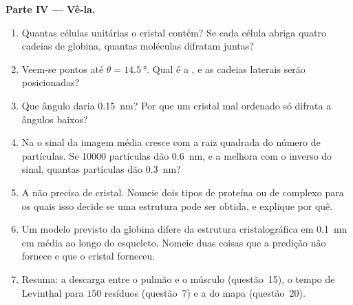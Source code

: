 \begin{problem}
\medskip
\noindent\textbf{Parte IV --- Vê-la.}
\begin{enumerate}[resume]
  \item Quantas células unitárias o cristal contém? Se cada célula
        abriga quatro cadeias de globina, quantas moléculas difratam
        juntas?
  \item Veem-se pontos até $\theta = \qty{14.5}{\degree}$. Qual é a
        , e as cadeias laterais serão posicionadas?
  \item Que ângulo daria \qty{0.15}{nm}? Por que um cristal mal
        ordenado só difrata a ângulos baixos?
  \item Na  o sinal da imagem média cresce
        com a raiz quadrada do número de partículas. Se \num{10000}
        partículas dão \qty{0.6}{nm}, e a  melhora com o
        inverso do sinal, quantas partículas dão \qty{0.3}{nm}?
  \item A  não precisa de cristal. Nomeie
        dois tipos de proteína ou de complexo para os quais isso decide
        se uma estrutura pode ser obtida, e explique por quê.
  \item Um modelo previsto da globina difere da estrutura
        cristalográfica em \qty{0.1}{nm} em média ao longo do
        esqueleto. Nomeie duas coisas que a predição não fornece e que
        o cristal forneceu.
  \item Resuma: a descarga entre o pulmão e o músculo (questão~15), o
        tempo de Levinthal para $150$ resíduos (questão~7) e a
         do mapa (questão~20).
\end{enumerate}
\end{problem}
